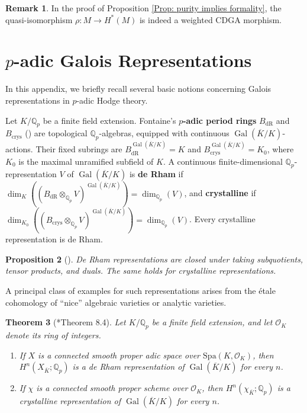 \documentclass[11pt]{amsart}
\newtheorem{theorem}{Theorem}[section]
\newtheorem{proposition}[theorem]{Proposition}
\theoremstyle{definition}
\newtheorem{remark}[theorem]{Remark}
\numberwithin{equation}{section}
\numberwithin{equation}{section}
\newcommand\QQ{\mathbb{Q}}
\newcommand\OO{\mathcal{O}}
\DeclareMathOperator{\et}{\acute{e}t}
\DeclareMathOperator{\dR}{dR}
\DeclareMathOperator{\crys}{crys}
\DeclareMathOperator{\Gal}{Gal}
\begin{document}
\begin{remark}\label{Rmk: formality uses a weighted CDGA morphism}
In the proof of Proposition \ref{Prop: purity implies formality}, the quasi-isomorphism $\rho:M\rightarrow H^*(M)$ is indeed a weighted CDGA morphism.
\end{remark}

\section{$p$-adic Galois Representations}\label{Appendix: p-adic Hodge theory}

In this appendix, we briefly recall several basic notions concerning Galois representations in $p$-adic Hodge theory. 

Let $K/\QQ_p$ be a finite field extension. Fontaine's \textbf{$p$-adic period rings} $B_{\dR}$ and $B_{\crys}$ (\cite{Fontaine-p-adic-hodge-I}\cite{Fontaine-p-adic-Hodge-II}) are topological $\QQ_{p}$-algebras, equipped with continuous $\Gal(\overline{K}/K)$-actions. Their fixed subrings are  $B_{\dR}^{\Gal(\overline{K}/K)}=K$ and $B_{\crys}^{\Gal(\overline{K}/K)}=K_0$, where $K_0$ is the maximal unramified subfield of $K$. A continuous finite-dimensional $\QQ_p$-representation $V$ of $\Gal(\overline{K}/K)$ is \textbf{de Rham} if $\dim_K((B_{\dR}\otimes_{\QQ_p}V)^{\Gal(\overline{K}/K)})=\dim_{\QQ_p}(V)$, and \textbf{crystalline} if $\dim_{K_0}((B_{\crys}\otimes_{\QQ_p}V)^{\Gal(\overline{K}/K)})=\dim_{\QQ_p}(V)$. Every crystalline representation is de Rham.

\begin{proposition}[\cite{Fontaine-p-adic-Hodge-III}]\label{Fact: properties of de Rahm crystalline representations}
De Rham representations are closed under taking subquotients, tensor products, and duals. The same holds for crystalline representations.
\end{proposition}

A principal class of examples for such representations arises from the \'etale cohomology of ``nice'' algebraic varieties or analytic varieties.

\begin{theorem}[\cite{Faltings-p-adic-Hodge}\cite{Scholze-p-adic-Hodge}*{Theorem 8.4}]
Let $K/\QQ_p$ be a finite field extension, and let $\mathcal{O}_{K}$ denote its ring of integers.
\begin{enumerate}[leftmargin=0.25in]
    \item If $X$ is a connected smooth proper adic space over $\mathrm{Spa}(K,\OO_{K})$, then $H^n_{\et}(X_{\overline{K}};\QQ_{p})$ is a de Rham representation of $\Gal(\overline{K}/K)$ for every $n$.
    \item If $\chi$ is a connected smooth proper scheme over $\mathcal{O}_{K}$, then $H^n_{\et}(\chi_{\overline{K}};\QQ_{p})$ is a crystalline representation of $\Gal(\overline{K}/K)$ for every $n$.
\end{enumerate}
\end{theorem}
\end{document}
